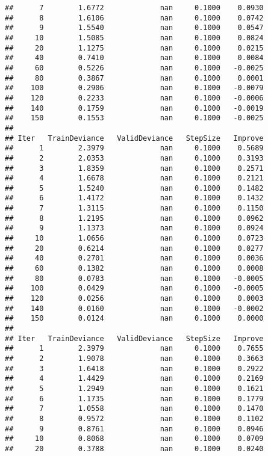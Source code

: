 \documentclass[]{article}
\begin{document}
\begin{verbatim}
##      7        1.6772             nan     0.1000    0.0930
##      8        1.6106             nan     0.1000    0.0742
##      9        1.5540             nan     0.1000    0.0547
##     10        1.5085             nan     0.1000    0.0824
##     20        1.1275             nan     0.1000    0.0215
##     40        0.7410             nan     0.1000    0.0084
##     60        0.5226             nan     0.1000   -0.0025
##     80        0.3867             nan     0.1000    0.0001
##    100        0.2906             nan     0.1000   -0.0079
##    120        0.2233             nan     0.1000   -0.0006
##    140        0.1759             nan     0.1000   -0.0019
##    150        0.1553             nan     0.1000   -0.0025
## 
## Iter   TrainDeviance   ValidDeviance   StepSize   Improve
##      1        2.3979             nan     0.1000    0.5689
##      2        2.0353             nan     0.1000    0.3193
##      3        1.8359             nan     0.1000    0.2571
##      4        1.6678             nan     0.1000    0.2121
##      5        1.5240             nan     0.1000    0.1482
##      6        1.4172             nan     0.1000    0.1432
##      7        1.3115             nan     0.1000    0.1150
##      8        1.2195             nan     0.1000    0.0962
##      9        1.1373             nan     0.1000    0.0924
##     10        1.0656             nan     0.1000    0.0723
##     20        0.6214             nan     0.1000    0.0277
##     40        0.2701             nan     0.1000    0.0036
##     60        0.1382             nan     0.1000    0.0008
##     80        0.0783             nan     0.1000   -0.0005
##    100        0.0429             nan     0.1000   -0.0005
##    120        0.0256             nan     0.1000    0.0003
##    140        0.0160             nan     0.1000   -0.0002
##    150        0.0124             nan     0.1000    0.0000
## 
## Iter   TrainDeviance   ValidDeviance   StepSize   Improve
##      1        2.3979             nan     0.1000    0.7655
##      2        1.9078             nan     0.1000    0.3663
##      3        1.6418             nan     0.1000    0.2922
##      4        1.4429             nan     0.1000    0.2169
##      5        1.2949             nan     0.1000    0.1621
##      6        1.1735             nan     0.1000    0.1779
##      7        1.0558             nan     0.1000    0.1470
##      8        0.9572             nan     0.1000    0.1102
##      9        0.8761             nan     0.1000    0.0946
##     10        0.8068             nan     0.1000    0.0709
##     20        0.3788             nan     0.1000    0.0240

\end{verbatim}
\end{document}
